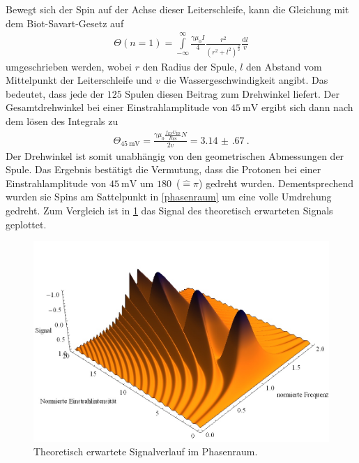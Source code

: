 \documentclass[paper=a4,
	fontsize=10pt,
	DIV=18,
	twocolumn,
	parskip=half
	]{scrartcl}
\numberwithin{equation}{section}    %
\begin{document}
Bewegt sich der Spin auf der Achse dieser Leiterschleife, kann die Gleichung mit dem Biot-Savart-Gesetz auf
\begin{align}
	\Theta(n=1)= \overset{\infty}{\underset{-\infty}{\int}}  \frac{\gamma \mu_0 I}{4}  \frac{r^2}{(r^2+l^2)^{\frac{3}{2}}} \frac{\mathrm{d}l}{v}
\end{align}
umgeschrieben werden, wobei $r$ den Radius der Spule, $l$ den Abstand vom Mittelpunkt der Leiterschleife und $v$ die Wassergeschwindigkeit angibt.
Das bedeutet, dass jede der $125$ Spulen diesen Beitrag zum Drehwinkel liefert.
Der Gesamtdrehwinkel bei einer Einstrahlamplitude von $\SI{45}{\milli\volt}$ ergibt sich dann nach dem lösen des Integrals zu
\begin{align}
	\Theta_{\SI{45}{\milli\volt}}=  \frac{\gamma \mu_0  \frac{f_{ES} U_{\mathrm{ES}}}{R_{\mathrm{ES}}} N}{2 v} = \SI{3.14(67)}{}.
\end{align}
Der Drehwinkel ist somit unabhängig von den geometrischen Abmessungen der Spule.
Das Ergebnis bestätigt die Vermutung, dass die Protonen bei einer Einstrahlamplitude von $\SI{45}{\milli\volt}$ um $180$\textdegree\ ($\widehat{=} \pi$) gedreht wurden.
Dementsprechend wurden sie Spins am Sattelpunkt in \cref{phasenraum} um eine volle Umdrehung gedreht.
Zum Vergleich ist in \cref{phasenraumTh} das Signal des theoretisch erwarteten Signals geplottet. 

\begin{figure}[htp]
	\begin{center}
		\includegraphics[width=\columnwidth]{Bilder/TheoriePR.jpg}
		\caption{Theoretisch erwartete Signalverlauf im Phasenraum.}
		\label{phasenraumTh}
	\end{center}
\end{figure}
\end{document}
